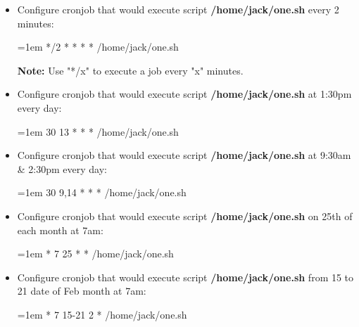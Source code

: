 \setlength{\columnsep}{3pt}
\begin{flushleft}
	\begin{itemize}
		\item Configure cronjob that would execute script \textbf{/home/jack/one.sh} every 2 minutes:
		\begin{tcolorbox}[breakable,notitle,boxrule=-0pt,colback=teal,colframe=teal]
			\color{white}
			\font=1em
			*/2     *    *   *   *  /home/jack/one.sh
			\font=4pt
		\end{tcolorbox}
		\bigskip
		
		\begin{tcolorbox}[breakable,notitle,boxrule=-0pt,colback=yellow,colframe=yellow]
			\color{black}
			\textbf{Note:} Use "*/x" to execute a job every "x" minutes.
		\end{tcolorbox}
		
		
		\bigskip
		\bigskip
		\item Configure cronjob that would execute script \textbf{/home/jack/one.sh} at 1:30pm every day:
		\begin{tcolorbox}[breakable,notitle,boxrule=-0pt,colback=teal,colframe=teal]
			\color{white}
			\font=1em
			30     13    *   *   *  /home/jack/one.sh
			\font=4pt
		\end{tcolorbox}
		
		\bigskip
		\bigskip
		\item Configure cronjob that would execute script \textbf{/home/jack/one.sh} at 9:30am \& 2:30pm every day:
		\begin{tcolorbox}[breakable,notitle,boxrule=-0pt,colback=teal,colframe=teal]
			\color{white}
			\font=1em
			30     9,14    *   *   *  /home/jack/one.sh
			\font=4pt
		\end{tcolorbox}
		
		\bigskip
		\bigskip
		\item Configure cronjob that would execute script \textbf{/home/jack/one.sh} on 25th of each month at 7am:
		\begin{tcolorbox}[breakable,notitle,boxrule=-0pt,colback=teal,colframe=teal]
			\color{white}
			\font=1em
			*     7    25   *   *  /home/jack/one.sh
			\font=4pt
		\end{tcolorbox}

		\bigskip
		\bigskip
		\item Configure cronjob that would execute script \textbf{/home/jack/one.sh} from 15 to 21 date of Feb month at 7am:
		\begin{tcolorbox}[breakable,notitle,boxrule=-0pt,colback=teal,colframe=teal]
			\color{white}
			\font=1em
			*     7    15-21   2   *  /home/jack/one.sh
			\font=4pt
		\end{tcolorbox}
		\bigskip


\end{itemize}
\end{flushleft}
